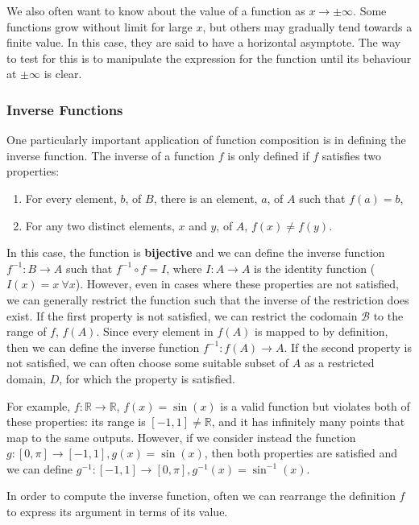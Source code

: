 \documentclass[11pt,titlepage]{article}
\numberwithin{equation}{subsection}
\begin{document}
We also often want to know about the value of a function as $x\rightarrow\pm\infty$. Some functions grow without limit for large $x$, but others may gradually tend towards a finite value. In this case, they are said to have a horizontal asymptote. The way to test for this is to manipulate the expression for the function until its behaviour at $\pm\infty$ is clear. 

\subsubsection{Inverse Functions}

One particularly important application of function composition is in defining the inverse function. The inverse of a function $f$ is only defined if $f$ satisfies two properties:

\begin{enumerate}
    \item For every element, $b$, of $B$, there is an element, $a$, of $A$ such that $f(a) = b$,
    \item For any two distinct elements, $x$ and $y$, of $A$, $f(x) \neq f(y)$.
\end{enumerate}

In this case, the function is \textbf{bijective} and we can define the inverse function $f^{-1}:B\to A$ such that $f^{-1}\circ f = I$, where $I:A\to A$ is the identity function ($I(x) = x\ \forall x$). However, even in cases where these properties are not satisfied, we can generally restrict the function such that the inverse of the restriction does exist. If the first property is not satisfied, we can restrict the codomain $\mathcal{B}$ to the range of $f$, $f(A)$. Since every element in $f(A)$ is mapped to by definition, then we can define the inverse function $f^{-1}:f(A)\to A$. If the second property is not satisfied, we can often choose some suitable subset of $A$ as a restricted domain, $D$, for which the property is satisfied.

For example, $f:\mathbb{R}\rightarrow\mathbb{R}$, $f(x) = \sin(x)$ is a valid function but violates both of these properties: its range is $[-1,1] \neq \mathbb{R}$, and it has infinitely many points that map to the same outputs. However, if we consider instead the function $g:[0,\pi]\rightarrow[-1,1], g(x) = \sin(x)$, then both properties are satisfied and we can define $g^{-1}:[-1,1]\rightarrow[0,\pi], g^{-1}(x) = \sin^{-1}(x)$.

In order to compute the inverse function, often we can rearrange the definition $f$ to express its argument in terms of its value.
\end{document}
